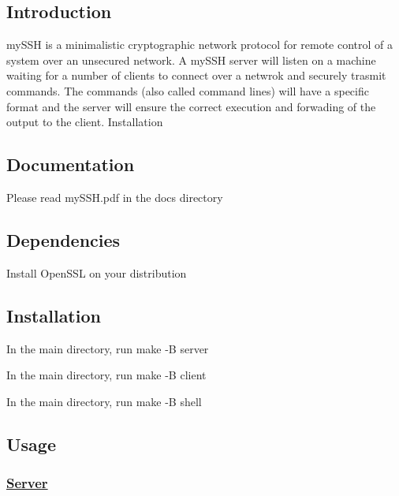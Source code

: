 \subsection*{Introduction}

my\+S\+SH is a minimalistic cryptographic network protocol for remote control of a system over an unsecured network. A my\+S\+SH server will listen on a machine waiting for a number of clients to connect over a netwrok and securely trasmit commands. The commands (also called command lines) will have a specific format and the server will ensure the correct execution and forwading of the output to the client. Installation

\subsection*{Documentation}

Please read my\+S\+S\+H.\+pdf in the docs directory

\subsection*{Dependencies}


\begin{DoxyEnumerate}
\item Install Open\+S\+SL on your distribution
\end{DoxyEnumerate}

\subsection*{Installation}


\begin{DoxyEnumerate}
\item In the main directory, run {\ttfamily make -\/B server}
\item In the main directory, run {\ttfamily make -\/B client}
\item In the main directory, run {\ttfamily make -\/B shell}
\end{DoxyEnumerate}

\subsection*{Usage}

\subsubsection*{\hyperlink{classServer}{Server}}



